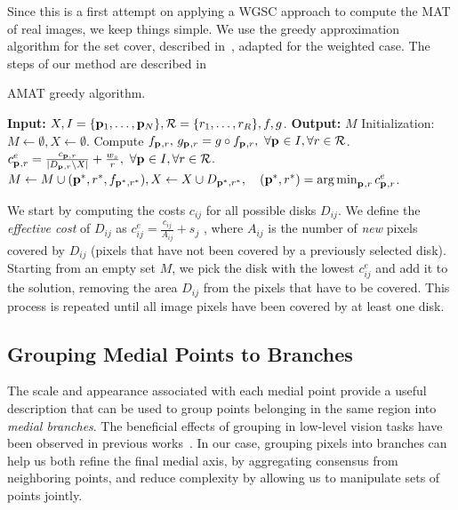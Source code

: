 \documentclass[10pt,twocolumn,letterpaper]{article}
\begin{document}
Since this is a first attempt on applying a WGSC approach to compute the MAT of real images, we keep things simple.
We use the greedy approximation algorithm for the set cover, described in~\cite{vazirani2013approximation},
adapted for the weighted case.
The steps of our method are described in~
\begin{algorithm}[t]
\caption{AMAT greedy algorithm.}
\label{alg:greedy}
	\begin{algorithmic}[1]
	\Statex \textbf{Input:} $X,I=\{\mathbf{p}_{1},\ldots,\mathbf{p}_{N}\},\mathcal{R}=\{r_1,\ldots,r_R\},f,g$.
	\Statex \textbf{Output:} $M$
	\State Initialization: $M \leftarrow \emptyset,X \leftarrow \emptyset$.
	\State Compute $f_{\mathbf{p}_{},r},\, g_{\mathbf{p}_{},r} = g \circ f_{\mathbf{p}_{},r},\,\, \forall \mathbf{p}_{} \in I, \forall r \in \mathcal{R}$.
		\State $c_{\mathbf{p}_{},r}^e = \frac{c_{\mathbf{p}_{},r}}{|D_{\mathbf{p}_{},r} \setminus X|}+\frac{w_s}{r},\,\, \forall \mathbf{p}_{} \in I, \forall r \in \mathcal{R}$.		
		\State $M\leftarrow M\cup{(\p{}^{*},r^{*},f_{\p{}^{*},r^{*}})},  \newline
				X \leftarrow X\cup D_{\p{}^{*},r^{*}}, \quad (\p{}^{*},r^{*}) = \argmin_{\p{},r}{c_{\p{},r}^e}$.		
	\EndWhile
	\end{algorithmic}
\end{algorithm}
We start by computing the costs $c_{ij}$ for all possible disks $D_{ij}$.
We define the \emph{effective cost} of $D_{ij}$ as $c_{ij}^e = \frac{c_{ij}}{A_{ij}} + s_j$ , where $A_{ij}$ is the number
of \emph{new} pixels covered by $D_{ij}$ (pixels that have not been covered by a previously selected disk).
Starting from an empty set $M$, we pick the disk with the lowest $c_{ij}^e$ and add it to the solution, 
removing the area $D_{ij}$ from the pixels that have to be covered.
This process is repeated until all image pixels have been covered by at least one disk.

\subsection{Grouping Medial Points to Branches}\label{sec:method:grouping}
The scale and appearance associated with each medial point provide a useful
description that can be used to group points belonging in the same region into \emph{medial branches}.
The beneficial effects of grouping in low-level vision tasks have been
observed in previous works~\cite{felzenszwalb2006min,zhu2007untangling,kokkinos2010highly}.
In our case, grouping pixels into branches can help us both refine the final medial axis, 
by aggregating consensus from neighboring points, and reduce complexity 
by allowing us to manipulate sets of points jointly.
\end{document}
